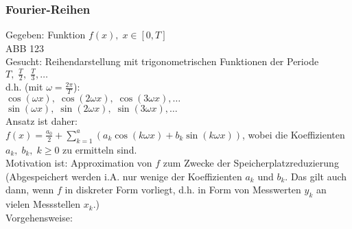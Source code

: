 \subsubsection{Fourier-Reihen}
Gegeben: Funktion $f(x), \; x \in [0,T]$\\
ABB 123\\
Gesucht: Reihendarstellung mit trigonometrischen Funktionen der Periode $T, \; \frac{T}{2}, \; \frac{T}{3}, \dots$\\
d.h. (mit $\omega= \frac{2\pi}{T}$):\\
$\cos (\omega x), \; \cos (2 \omega x) ,\; \cos (3 \omega x) , \dots$\\
$\sin (\omega x), \; \sin (2 \omega x) ,\; \sin (3 \omega x), \dots$\\
Ansatz ist daher:\\
$f(x) = \frac{a_0}{2}+\sum_{k=1}^a \left( a_k \cos (k\omega x) + b_k \sin (k\omega x) \right)$, wobei die Koeffizienten $a_k, \; b_k,\; k\geq 0$ zu ermitteln sind.\\
Motivation ist: Approximation von $f$ zum Zwecke der Speicherplatzreduzierung (Abgespeichert werden i.A. nur wenige der Koeffizienten $a_k$ und $b_k$. Das gilt auch dann, wenn $f$ in diskreter Form vorliegt, d.h. in Form von Messwerten $y_k$ an vielen Messstellen $x_k$.)\\
Vorgehensweise:
